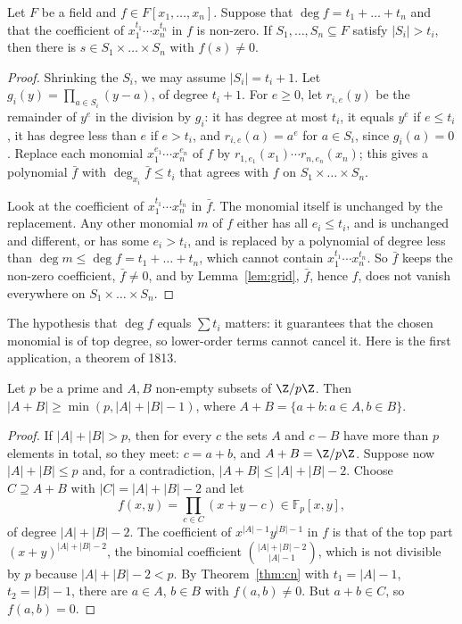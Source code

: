 \begin{theorem}\label{thm:cn}
Let $F$ be a field and $f\in F[x_1,\dots,x_n]$. Suppose that $\deg f=t_1+\dots+t_n$ and that the coefficient of $x_1^{t_1}\cdots x_n^{t_n}$ in $f$ is non-zero. If $S_1,\dots,S_n\subseteq F$ satisfy $|S_i|>t_i$, then
there is $s\in S_1\times\dots\times S_n$ with $f(s)\ne0$.
\end{theorem}
\begin{proof}
Shrinking the $S_i$, we may assume $|S_i|=t_i+1$. Let $g_i(y)=\prod_{a\in S_i}(y-a)$, of degree $t_i+1$. For $e\ge0$, let $r_{i,e}(y)$ be the remainder of $y^e$ in the division by $g_i$: it has degree at most $t_i$, it
equals $y^e$ if $e\le t_i$, it has degree less than $e$ if $e>t_i$, and $r_{i,e}(a)=a^e$ for $a\in S_i$, since $g_i(a)=0$. Replace each monomial $x_1^{e_1}\cdots x_n^{e_n}$ of $f$ by $r_{1,e_1}(x_1)\cdots r_{n,e_n}(x_n)$; this gives
a polynomial $\bar f$ with $\deg_{x_i}\bar f\le t_i$ that agrees with $f$ on $S_1\times\dots\times S_n$.

Look at the coefficient of $x_1^{t_1}\cdots x_n^{t_n}$ in $\bar f$. The monomial itself is unchanged by the replacement. Any other monomial $m$ of $f$ either has all $e_i\le t_i$, and is unchanged and different, or has
some $e_i>t_i$, and is replaced by a polynomial of degree less than $\deg m\le\deg f=t_1+\dots+t_n$, which cannot contain $x_1^{t_1}\cdots x_n^{t_n}$. So $\bar f$ keeps the non-zero coefficient, $\bar f\ne0$, and by
Lemma~\ref{lem:grid}, $\bar f$, hence $f$, does not vanish everywhere on $S_1\times\dots\times S_n$.
\end{proof}

The hypothesis that $\deg f$ equals $\sum t_i$ matters: it guarantees that the chosen monomial is of top degree, so lower-order terms cannot cancel it. Here is the first application, a theorem of 1813.

\begin{theorem}\label{thm:cd}
Let $p$ be a prime and $A,B$ non-empty subsets of $\Z/p\Z$. Then $|A+B|\ge\min(p,|A|+|B|-1)$, where $A+B=\{a+b:a\in A,b\in B\}$.
\end{theorem}
\begin{proof}
If $|A|+|B|>p$, then for every $c$ the sets $A$ and $c-B$ have more than $p$ elements in total, so they meet: $c=a+b$, and $A+B=\Z/p\Z$. Suppose now $|A|+|B|\le p$ and, for a contradiction,
$|A+B|\le|A|+|B|-2$. Choose $C\supseteq A+B$ with $|C|=|A|+|B|-2$ and let
\[
f(x,y)=\prod_{c\in C}(x+y-c)\in\mathbb F_p[x,y],
\]
of degree $|A|+|B|-2$. The coefficient of $x^{|A|-1}y^{|B|-1}$ in $f$ is that of the top part $(x+y)^{|A|+|B|-2}$, the binomial coefficient $\binom{|A|+|B|-2}{|A|-1}$, which is not divisible by $p$ because
$|A|+|B|-2<p$. By Theorem~\ref{thm:cn} with $t_1=|A|-1$, $t_2=|B|-1$, there are $a\in A$, $b\in B$ with $f(a,b)\ne0$. But $a+b\in C$, so $f(a,b)=0$.
\end{proof}

